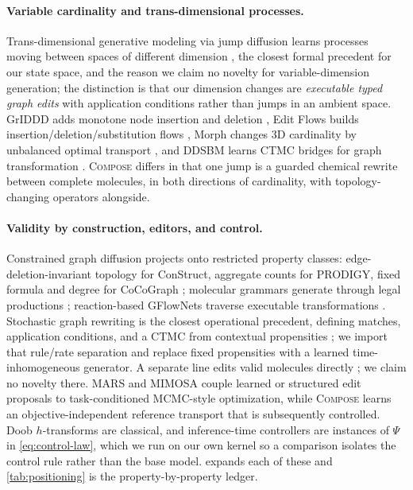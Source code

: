 \documentclass{article}
\newcommand{\method}{\textsc{Compose}\xspace}
\theoremstyle{definition}
\theoremstyle{remark}
\begin{document}
\paragraph{Variable cardinality and trans-dimensional processes.}
Trans-dimensional generative modeling via jump diffusion learns processes moving between spaces of different dimension \citep{campbell2023jump}, the closest formal precedent for our state space, and the reason we claim no novelty for variable-dimension generation; the distinction is that our dimension changes are \emph{executable typed graph edits} with application conditions rather than jumps in an ambient space. GrIDDD adds monotone node insertion and deletion \citep{ninniri2025griddd}, Edit Flows builds insertion/deletion/substitution flows \citep{havasi2025editflows}, Morph changes 3D cardinality by unbalanced optimal transport \citep{franke2026morph}, and DDSBM learns CTMC bridges for graph transformation \citep{kim2025ddsbm}. \method differs in that one jump is a guarded chemical rewrite between complete molecules, in both directions of cardinality, with topology-changing operators alongside.

\paragraph{Validity by construction, editors, and control.}
Constrained graph diffusion projects onto restricted property classes: edge-deletion-invariant topology for ConStruct, aggregate counts for PRODIGY, fixed formula and degree for CoCoGraph \citep{madeira2024construct,sharma2024prodigy,ruizbotella2026cocograph}; molecular grammars generate through legal productions \citep{kajino2019mhg,guo2022grammar}; reaction-based GFlowNets traverse executable transformations \citep{koziarski2024rgfn,zhu2026spacegfn}. Stochastic graph rewriting is the closest operational precedent, defining matches, application conditions, and a CTMC from contextual propensities \citep{danos2015thermodynamic,behr2021rewriting}; we import that rule/rate separation and replace fixed propensities with a learned time-inhomogeneous generator. A separate line edits valid molecules directly \citep{xie2021mars,fu2021mimosa,jensen2019graphga,gao2022pmo}; we claim no novelty there. MARS and MIMOSA couple learned or structured edit proposals to task-conditioned MCMC-style optimization, while \method learns an objective-independent reference transport that is subsequently controlled. Doob $h$-transforms are classical, and inference-time controllers are instances of $\Psi$ in \eqref{eq:control-law}, which we run on our own kernel so a comparison isolates the control rule rather than the base model.  expands each of these and \cref{tab:positioning} is the property-by-property ledger.
\end{document}
